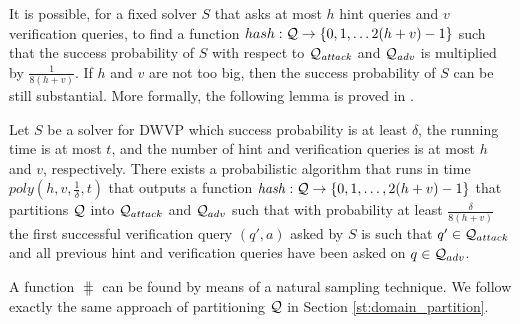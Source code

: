 It is possible, for a fixed solver $S$ that asks at most $h$ hint queries and $v$ verification queries,
to find a function $hash: \mathcal{Q} \rightarrow \{0,1,\dotsc 2(h+v)-1\}$ such that the success probability of $S$ with respect to
$\mathcal{Q}_{\mathit{attack}}$ and $\mathcal{Q}_{\mathit{adv}}$ is multiplied by $\frac{1}{8(h+v)}$.
If $h$ and $v$ are not too big, then the success probability of $S$ can be still substantial.
More formally, the following lemma is proved in \cite{dodis2009security}.
\begin{lemma}
  \label{lemma:hash_function_previous}
Let $S$ be a solver for DWVP which success probability is at least $\delta$, the running time is at most $t$,
and the number of hint and verification queries is at most $h$ and $v$, respectively.
There exists a probabilistic algorithm that runs in time $poly(h,v,\frac{1}{\delta},t)$
that outputs a function $\operatorname{\mathit{hash}} : \mathcal{Q} \rightarrow \{0,1, \dotsc, 2(h+v)-1\}$
that partitions $\mathcal{Q}$ into $\mathcal{Q}_{attack}$ and $\mathcal{Q}_{adv}$ such that
with probability at least $\frac{\delta}{8(h+v)}$ the first successful verification query $(q',a)$ asked by $S$ is such that $q' \in \mathcal{Q}_{attack}$
and all previous hint and verification queries have been asked on $q \in \mathcal{Q}_{adv}$.
\end{lemma}
A function $\hash$ can be found by means of a natural sampling technique.
We follow exactly the same approach of partitioning $\mathcal{Q}$ in Section \ref{st:domain_partition}.

